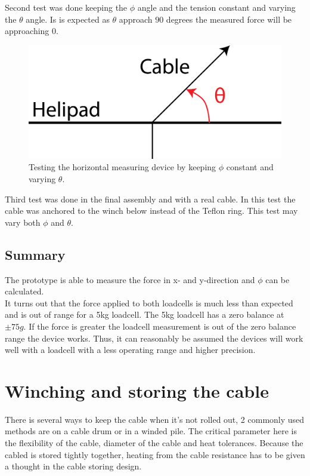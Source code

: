 

\noindent
Second test was done keeping the $\phi$ angle and the tension constant and varying the $\theta$ angle. Is is expected as $\theta$ approach $90$ degrees the measured force will be approaching $0$. 
\begin{figure}[H]
\centering
\includegraphics[scale=0.75]{graphics/loadcell_test2.png}
\caption{Testing the horizontal measuring device by keeping $\phi$ constant and varying $\theta$.}
\label{fig:loadcell_test2}
\end{figure}

\noindent
Third test was done in the final assembly and with a real cable. In this test the cable was anchored to the winch below instead of the Teflon ring. This test may vary both $\phi$ and $\theta$.
\noindent


\subsection{Summary}
The prototype is able to measure the force in x- and y-direction and $\phi$ can be calculated. \\
\noindent
It turns out that the force applied to both loadcells is much less than expected and is out of range for a 5kg loadcell. The 5kg loadcell has a zero balance at $\pm75g$. If the force is greater the loadcell measurement is out of the zero balance range the device works. Thus, it can reasonably be assumed the devices will work well with a loadcell with a less operating range and higher precision.  




\section{Winching and storing the cable}
There is several ways to keep the cable when it's not rolled out, 2 commonly used methods are on a cable drum or in a winded pile. The critical parameter here is the flexibility of the cable, diameter of the cable and heat tolerances.  Because the cabled is stored tightly together, heating from the cable resistance has to be given a thought in the cable storing design.

